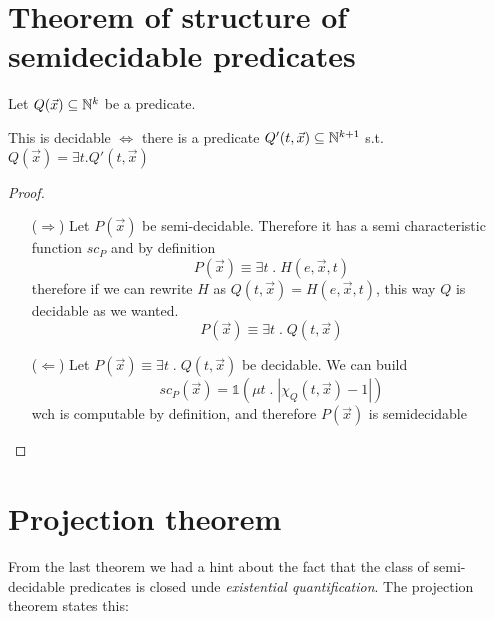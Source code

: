\section {Theorem of structure of semidecidable predicates}

\begin{theorem}\label{th:structure}
  Let $ Q(\vec{x}) \subseteq \mathbb{N}^k $ be a predicate.

  This is decidable $ \Leftrightarrow $ there is a predicate $
  Q'(t,\vec{x}) \subseteq \mathbb{N}^{k+1} $ s.t. $ Q(\vec{x}) = \exists
  t. Q'(t,\vec{x}) $
  \begin{proof}
    \begin{itemize}
    \item[($\Rightarrow$)] Let $P(\vec{x})$ be
      semi-decidable. Therefore it has a semi characteristic function
      $sc_P$ and by definition
      \[
        P(\vec{x}) \equiv \exists t \; . \; H(e,\vec{x}, t)
      \]
      therefore if we can rewrite $H$ as
      $Q(t, \vec{x}) = H(e,\vec{x}, t)$, this way $Q$ is decidable as
      we wanted. \[P(\vec{x}) \equiv \exists t \; . \; Q(t, \vec{x})\]

    \item[($\Leftarrow$)] Let
      \(P(\vec{x}) \equiv \exists t \; . \; Q(t, \vec{x})\) be
      decidable. We can build
      \[
        sc_P(\vec{x}) = \mathds{1}(\mu t \; . \; |\chi_Q(t,\vec{x}) - 1|)
      \]
      wch is computable by definition, and therefore $P(\vec{x})$ is
      semidecidable
    \end{itemize} 
  \end{proof}
\end{theorem}

\section {Projection theorem}

From the last theorem we had a hint about the fact that the class of
semi-decidable predicates is closed unde \emph{existential
  quantification}. The projection theorem states this:

